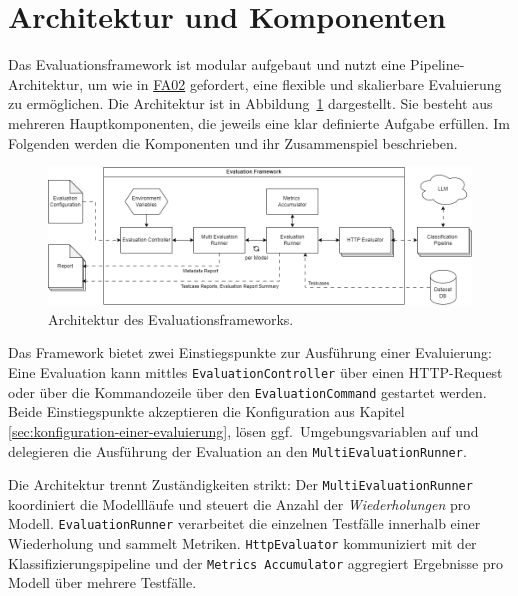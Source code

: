 \section{Architektur und Komponenten}\label{sec:architektur-und-komponenten}

Das Evaluationsframework ist modular aufgebaut und nutzt eine Pipeline-Architektur, um wie in \hyperlink{FA02}{FA02} gefordert, eine flexible und skalierbare Evaluierung zu ermöglichen. Die Architektur ist in Abbildung~\ref{fig:evaluation-framework-architecture} dargestellt. Sie besteht aus mehreren Hauptkomponenten, die jeweils eine klar definierte Aufgabe erfüllen. Im Folgenden werden die Komponenten und ihr Zusammenspiel beschrieben.

\begin{figure}[h]
    \centering
    \includegraphics[width=\linewidth]{images/evaluation/evaluation-framework-architecture.drawio}
    \caption{Architektur des Evaluationsframeworks.}
    \label{fig:evaluation-framework-architecture}
\end{figure}

Das Framework bietet zwei Einstiegspunkte zur Ausführung einer Evaluierung: Eine Evaluation kann mittles \texttt{EvaluationController} über einen HTTP-Request oder über die Kommandozeile über den \texttt{EvaluationCommand} gestartet werden. Beide Einstiegspunkte akzeptieren die Konfiguration aus Kapitel \ref{sec:konfiguration-einer-evaluierung}, lösen ggf.\ Umgebungsvariablen auf und delegieren die Ausführung der Evaluation an den \texttt{MultiEvaluationRunner}.

Die Architektur trennt Zuständigkeiten strikt: Der \texttt{MultiEvaluationRunner} koordiniert die Modellläufe und steuert die Anzahl der \emph{Wiederholungen} pro Modell. \texttt{EvaluationRunner} verarbeitet die einzelnen Testfälle innerhalb einer Wiederholung und sammelt Metriken. \texttt{HttpEvaluator} kommuniziert mit der Klassifizierungspipeline und der \texttt{Metrics Accumulator} aggregiert Ergebnisse pro Modell über mehrere Testfälle.